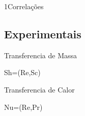 \documentclass[\mainfilename]{subfiles}
\begin{document}
\begin{sectionBox}1{Correlações} %
    
    \subsection*{Experimentais}
    \begin{multicols}{2}
        Transferencia de Massa
        \begin{BM}
            Sh=\Psi(Re,Sc)
        \end{BM}

        Transferencia de Calor
        \begin{BM}
            Nu=\Psi(Re,Pr)
        \end{BM}
    \end{multicols}
    
\end{sectionBox}
\end{document}
